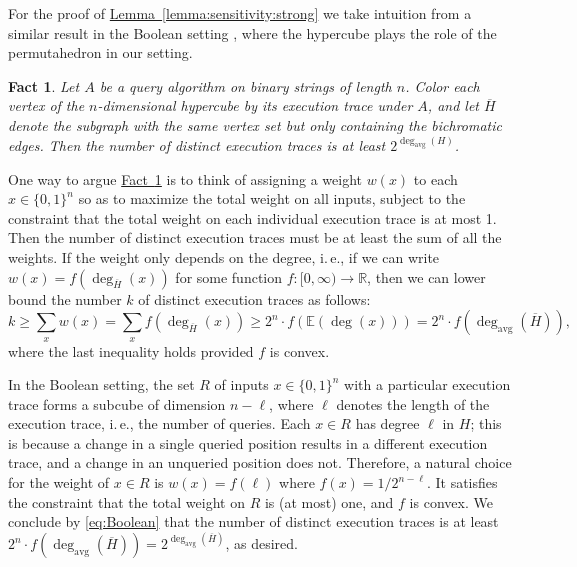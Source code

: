 \documentclass[11pt]{article}
\numberwithin{equation}{section}
\newtheorem{fact}[theorem]{Fact}
\theoremstyle{definition}
\theoremstyle{plain}
\newcommand{\ie}{i.\,e.}
\newcommand{\expref}[2]{\hyperref[#2]{#1~\ref{#2}}}
\newcommand{\avgdeg}{\deg_\mathrm{avg}}
\newcommand{\Expect}{\mathbb{E}}
\begin{document}
For the proof of \expref{Lemma}{lemma:sensitivity:strong} we take intuition from a similar result in the Boolean setting \cite[Exercise~8.43]{ODonnell2014}, where the hypercube plays the role of the permutahedron in our setting.
\begin{fact}\label{fact:Boolean} 
Let $A$ be a query algorithm on binary strings of length $n$. Color each vertex of the $n$-dimensional hypercube by its execution trace under $A$, and let $\overline{H}$ denote the subgraph with the same vertex set but only containing the bichromatic edges. Then the number of distinct execution traces is at least $2^{\avgdeg(H)}$.
\end{fact}

One way to argue \expref{Fact}{fact:Boolean} is to think of assigning a weight $w(x)$ to each $x \in \{0,1\}^n$ so as to maximize the total weight on all inputs, subject to the constraint that the total weight on each individual execution trace is at most 1. Then the number of distinct execution traces must be at least the sum of all the weights. If the weight only depends on the degree, \ie, if we can write $w(x) = f(\deg_{\overline{H}}(x))$ for some function $f: [0,\infty) \to \mathbb{R}$, then we can lower bound the number $k$ of distinct execution traces as follows:
\begin{equation}\label{eq:Boolean}
k \ge \sum_x w(x) = \sum_x f(\deg_{\overline{H}}(x)) \ge 2^n \cdot f(\Expect(\deg(x))) = 2^n \cdot f(\avgdeg(\overline{H})),
\end{equation}
where the last inequality holds provided $f$ is convex. 

In the Boolean setting, the set $R$ of inputs $x \in \{0,1\}^n$ with a particular execution trace forms a subcube of dimension $n-\ell$, where $\ell$ denotes the length of the execution trace, \ie, the number of queries. Each $x \in R$ has degree $\ell$ in $H$; this is because a change in a single queried position results in a different execution trace, and a change in an unqueried position does not. Therefore, a natural choice for the weight of $x \in R$ is $w(x) = f(\ell)$ where $f(x) = 1/2^{n-\ell}$. It satisfies the constraint that the total weight on $R$ is (at most) one, and $f$ is convex. We conclude by \eqref{eq:Boolean} that the number of distinct execution traces is at least $2^n \cdot f(\avgdeg(\overline{H})) = 2^{\avgdeg(\overline{H})}$, as desired.
\end{document}
